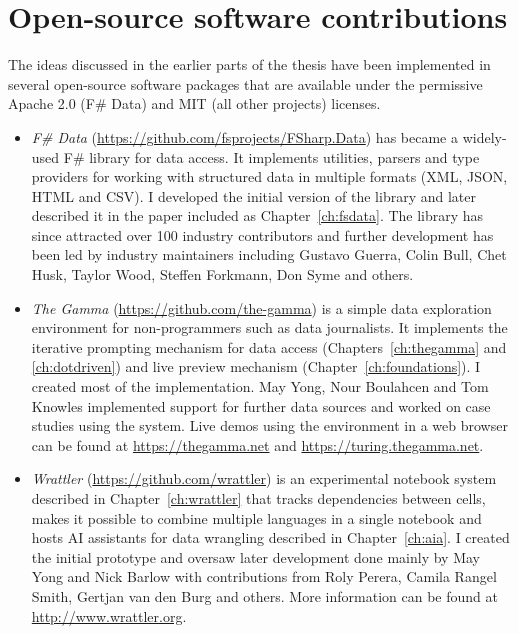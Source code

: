 \documentclass[fleqn,11pt]{report}
\theoremstyle{definition}
\newenvironment{nitemize}
{ \vspace{-0.4em}
  \begin{itemize}
    \setlength{\itemsep}{5pt}
    \setlength{\parskip}{0pt}
    \setlength{\parsep}{0pt} }
{ \end{itemize}
  \vspace{-0.4em} }
\begin{document}
\section{Open-source software contributions}

The ideas discussed in the earlier parts of the thesis have been implemented in several
open-source software packages that are available under the permissive Apache 2.0 (F\# Data)
and MIT (all other projects) licenses.

\begin{nitemize}
  \item \emph{F\# Data} (\url{https://github.com/fsprojects/FSharp.Data}) has became a widely-used
    F\# library for data access. It implements utilities, parsers and type providers for working
    with structured data in multiple formats (XML, JSON, HTML and CSV). I developed the initial
    version of the library and later described it in the paper included as Chapter~\ref{ch:fsdata}.
    The library has since attracted over 100 industry contributors and further development has been
    led by industry maintainers including Gustavo Guerra, Colin Bull, Chet Husk, Taylor Wood,
    Steffen Forkmann, Don Syme and others.

  \item \emph{The Gamma} (\url{https://github.com/the-gamma}) is a simple data exploration
    environment for non-programmers such as data journalists. It implements the iterative
    prompting mechanism for data access (Chapters~\ref{ch:thegamma} and \ref{ch:dotdriven})
    and live preview mechanism (Chapter~\ref{ch:foundations}). I created most of the implementation.
    May Yong, Nour Boulahcen and Tom Knowles implemented support for further data sources and
    worked on case studies using the system. Live demos using the environment
    in a web browser can  be found at \url{https://thegamma.net} and \url{https://turing.thegamma.net}.

  \item \emph{Wrattler} (\url{https://github.com/wrattler}) is an experimental notebook system
    described in Chapter~\ref{ch:wrattler} that tracks dependencies between cells, makes it
    possible to combine multiple languages in a single notebook and hosts AI assistants for
    data wrangling described in Chapter~\ref{ch:aia}. I created the initial prototype and oversaw
    later development done mainly by May Yong and Nick Barlow with contributions from
    Roly Perera, Camila Rangel Smith, Gertjan van den Burg and others. More information can be
    found at \url{http://www.wrattler.org}.


\end{nitemize}
\end{document}
